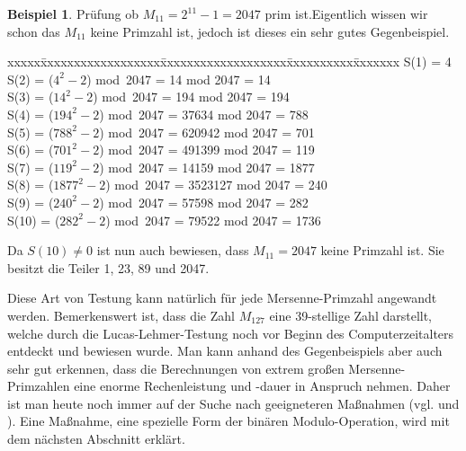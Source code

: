 \documentclass[12pt,a4paper]{article}
\theoremstyle{definition}
\newtheorem{bsp}{Beispiel}[subsection]
\begin{document}
\newpage

\begin{bsp}{Prüfung ob $M_{11} = 2^{11} - 1 = 2047$ prim ist}.\label{bsp}\newline
Eigentlich wissen wir schon das $M_{11}$ keine Primzahl ist, jedoch ist dieses ein sehr gutes Gegenbeispiel.
\begin{tabbing}
xxxxx\=xxxxxxxxxxxxxxxxxx\=xxxxxxxxxxxxxxxxxxx\=xxxxxxxxxx\=xxxxxxx\kill
\> S(1)  = 4 \\
\> S(2)  = ($4^2 - 2$)    \> mod\ 2047 = 14      \> mod 2047 \> = 14 \\
\> S(3)  = ($14^2 - 2$)   \> mod\ 2047 = 194     \> mod 2047 \> = 194 \\
\> S(4)  = ($194^2 - 2$)  \> mod\ 2047 = 37634   \> mod 2047 \> = 788 \\
\> S(5)  = ($788^2 - 2$)  \> mod\ 2047 = 620942  \> mod 2047 \> = 701 \\
\> S(6)  = ($701^2 - 2$)  \> mod\ 2047 = 491399  \> mod 2047 \> = 119 \\
\> S(7)  = ($119^2 - 2$)  \> mod\ 2047 = 14159   \> mod 2047 \> = 1877 \\
\> S(8)  = ($1877^2 - 2$) \> mod\ 2047 = 3523127 \> mod 2047 \> = 240 \\
\> S(9)  = ($240^2 - 2$)  \> mod\ 2047 = 57598   \> mod 2047 \> = 282 \\
\> S(10) = ($282^2 - 2$)  \> mod\ 2047 = 79522   \> mod 2047 \> = 1736
\end{tabbing}
Da $S(10) \neq 0$ ist nun auch bewiesen, dass $M_{11} = 2047$ keine Primzahl ist.
Sie besitzt die Teiler 1, 23, 89 und 2047.
\end{bsp}
Diese Art von Testung kann natürlich für jede Mersenne-Primzahl angewandt werden.
Bemerkenswert ist, dass die Zahl $M_{127}$ eine 39-stellige Zahl darstellt, welche durch die Lucas-Lehmer-Testung noch vor Beginn des Computerzeitalters entdeckt und bewiesen wurde.\newline
Man kann anhand des Gegenbeispiels aber auch sehr gut erkennen, dass die Berechnungen von extrem großen Mersenne-Primzahlen eine enorme Rechenleistung und -dauer in Anspruch nehmen.
Daher ist man heute noch immer auf der Suche nach geeigneteren Maßnahmen (vgl. \cite[78--80]{Ribenboim2006} und \cite[183--184]{Crandall2005}).
Eine Maßnahme, eine spezielle Form der binären Modulo-Operation, wird mit dem nächsten Abschnitt erklärt.
\end{document}
